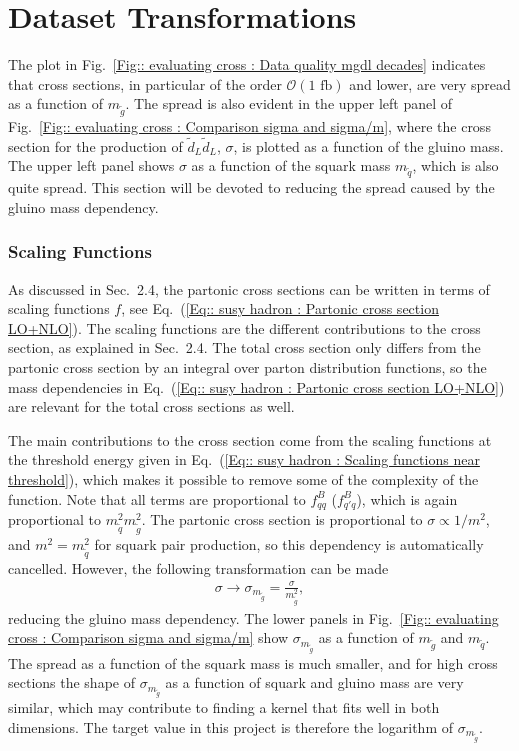 \documentclass[twoside,english]{uiofysmaster}
\begin{document}
\section{Dataset Transformations}

The plot in Fig.~\ref{Fig:: evaluating cross : Data quality mgdl decades} indicates that cross sections, in particular of the order $\mathcal{O}(1 \text{ fb})$ and lower, are very spread as a function of $m_{\tilde{g}}$. The spread is also evident in the upper left panel of Fig.~\ref{Fig:: evaluating cross : Comparison sigma and sigma/m}, where the cross section for the production of $\tilde{d}_L \tilde{d}_L$, $\sigma$, is plotted as a function of the gluino mass. The upper left panel shows $\sigma$ as a function of the squark mass $m_{\tilde{q}}$, which is also quite spread. This section will be devoted to reducing the spread caused by the gluino mass dependency.

\subsubsection{Scaling Functions}\label{Sec:: evaluating cross : Scaling Functions}

As discussed in Sec.~2.4, the partonic cross sections can be written in terms of scaling functions $f$, see Eq.~(\ref{Eq:: susy hadron : Partonic cross section LO+NLO}). The scaling functions are the different contributions to the cross section, as explained in Sec.~2.4. The total cross section only differs from the partonic cross section by an integral over parton distribution functions, so the mass dependencies in Eq.~(\ref{Eq:: susy hadron : Partonic cross section LO+NLO}) are relevant for the total cross sections as well.

The main contributions to the cross section come from the scaling functions at the threshold energy given in Eq.~(\ref{Eq:: susy hadron : Scaling functions near threshold}), which makes it possible to remove some of the complexity of the function. Note that all terms are proportional to $f_{qq}^B$ ($f_{q'q}^B$), which is again proportional to $m_{\tilde{q}}^2 m_{\tilde{g}}^2$. The partonic cross section is proportional to $\sigma \propto 1/m^2$, and $m^2 = m_{\tilde{q}}^2$ for squark pair production, so this dependency is automatically cancelled. However, the following transformation can be made
\begin{align}
\sigma \rightarrow \sigma_{m_{\tilde{g}}} = \frac{\sigma}{m_{\tilde{g}}^2},
\end{align}
reducing the gluino mass dependency. The lower panels in Fig.~\ref{Fig:: evaluating cross : Comparison sigma and sigma/m} show $\sigma_{m_{\tilde{g}}}$ as a function of $m_{\tilde{g}}$ and $m_{\tilde{q}}$. The spread as a function of the squark mass is much smaller, and for high cross sections the shape of $\sigma_{m_{\tilde{g}}}$ as a function of squark and gluino mass are very similar, which may contribute to finding a kernel that fits well in both dimensions. The target value in this project is therefore the logarithm of $\sigma_{m_{\tilde{g}}}$.  
\end{document}
